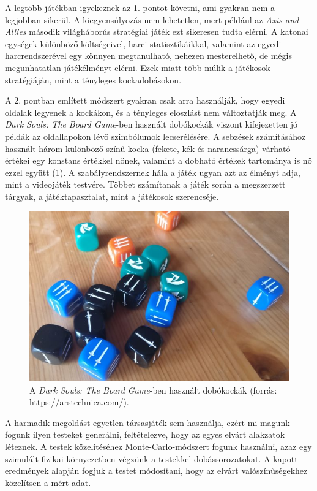 A legtöbb játékban igyekeznek az 1. pontot követni, ami gyakran nem a legjobban sikerül.
A kiegyensúlyozás nem lehetetlen, mert például az \textit{Axis and Allies} \cite{axisnallies} második világháborús stratégiai játék ezt sikeresen tudta elérni.
A katonai egységek különböző költségeivel, harci statisztikáikkal, valamint az egyedi harcrendszerével egy könnyen megtanulható, nehezen mesterelhető, de mégis megunhatatlan játékélményt elérni.
Ezek miatt több múlik a játékosok stratégiáján, mint a tényleges kockadobásokon.

A 2. pontban említett módszert gyakran csak arra használják, hogy egyedi oldalak legyenek a kockákon, és a tényleges eloszlást nem változtatják meg.
A \textit{Dark Souls: The Board Game}-ben \cite{darksouls} használt dobókockák viszont kifejezetten jó példák az oldallapokon lévő szimbólumok lecserélésére.
A sebzések számításához használt három különböző színű kocka (fekete, kék és narancssárga) várható értékei egy konstans értékkel nőnek, valamint a dobható értékek tartománya is nő ezzel együtt (\ref{fig:dsdice}).
A szabályrendszernek hála a játék ugyan azt az élményt adja, mint a videojáték testvére.
Többet számítanak a játék során a megszerzett tárgyak, a játéktapasztalat, mint a játékosok szerencséje.

\begin{figure}[h!]
	\centering
	\includegraphics[scale=0.6]{images/dsdice.png}
	\caption{A \textit{Dark Souls: The Board Game}-ben használt dobókockák (forrás: \url{https://arstechnica.com/}).}
	\label{fig:dsdice}
\end{figure}

A harmadik megoldást egyetlen társasjáték sem használja, ezért mi magunk fogunk ilyen testeket generálni, feltételezve, hogy az egyes elvárt alakzatok léteznek.
A testek közelítéséhez Monte-Carlo-módszert fogunk használni, azaz egy szimulált fizikai környezetben végzünk a testekkel dobássorozatokat.
A kapott eredmények alapján fogjuk a testet módosítani, hogy az elvárt valószínűségekhez közelítsen a mért adat.